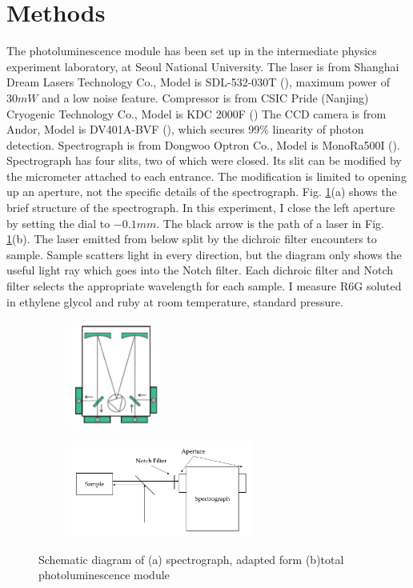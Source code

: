 \documentclass{article}
\begin{document}
\section{Methods}
 The photoluminescence module has been set up in the intermediate physics experiment laboratory, at Seoul National University.
 The laser is from Shanghai Dream Lasers Technology Co., Model is SDL-532-030T (\cite{laser_spec}), maximum power of $30mW$ and a low noise feature.
 Compressor is from CSIC Pride (Nanjing) Cryogenic Technology Co., Model is KDC 2000F (\cite{compressor_spec})
 The CCD camera is from Andor, Model is DV401A-BVF (\cite{ccd_spec}), which secures 99\% linearity of photon detection.
 Spectrograph is from Dongwoo Optron Co., Model is MonoRa500I (\cite{spectrograph_spec}).
 Spectrograph has four slits, two of which were closed.
 Its slit can be modified by the micrometer attached to each entrance.
 The modification is limited to opening up an aperture, not the specific details of the spectrograph.
 Fig. \ref{fig:apparatus_sketch}(a) shows the brief structure of the spectrograph.
 In this experiment, I close the left aperture by setting the dial to $-0.1mm$.
 The black arrow is the path of a laser in Fig. \ref{fig:apparatus_sketch}(b).
 The laser emitted from below split by the dichroic filter encounters to sample.
 Sample scatters light in every direction, but the diagram only shows the useful light ray which goes into the Notch filter.
 Each dichroic filter and Notch filter selects the appropriate wavelength for each sample.
 I measure R6G soluted in ethylene glycol and ruby at room temperature, standard pressure.

 \begin{figure}[ht]
  \centering
  \begin{subfigure}[b]{6cm}
      \centering
      \includegraphics[width=3cm]{../results/spectrograph_sketch.png}
      \caption{}
  \end{subfigure}
  \hfill
  \begin{subfigure}[b]{6cm}
      \centering
      \includegraphics[width=6cm]{../results/total_module_sketch.png}
      \caption{}
  \end{subfigure}
  \hfill
  \caption{Schematic diagram of (a) spectrograph, adapted form  \cite{spectrograph_spec} (b)total photoluminescence module}
  \label{fig:apparatus_sketch}
\end{figure}
\end{document}
